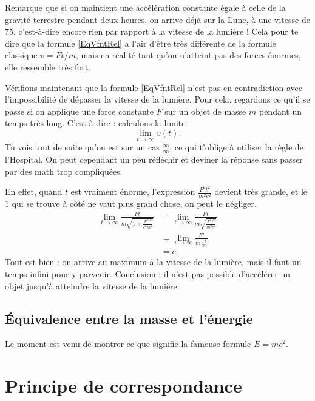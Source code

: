 Remarque que si on maintient une accélération constante égale à celle de la gravité terrestre pendant deux heures, on arrive déjà sur la Lune, à une vitesse de \unit{75}{\kilo\meter\per\second}, c'est-à-dire encore rien par rapport à la vitesse de la lumière ! Cela pour te dire que la formule \eqref{EqVfntRel} a l'air d'être très différente de la formule classique $v=Ft/m$, mais en réalité tant qu'on n'atteint pas des forces énormes, elle ressemble très fort.

Vérifions maintenant que la formule \eqref{EqVfntRel} n'est pas en contradiction avec l'impossibilité de dépasser la vitesse de la lumière. Pour cela, regardons ce qu'il se passe si on applique une force constante $F$ sur un objet de masse $m$ pendant un temps très long. C'est-à-dire : calculons la limite
\[
  \lim_{t\to\infty}v(t).
\]
Tu vois tout de suite qu'on est sur un cas $\frac{ \infty }{ \infty }$, ce qui t'oblige à utiliser la règle de l'Hospital. On peut cependant un peu réfléchir et deviner la réponse sans passer par des math trop compliquées.

En effet, quand $t$ est vraiment énorme, l'expression $\frac{ F^2t^2 }{ m^2c^2 }$ devient très grande, et le $1$ qui se trouve à côté ne vaut plus grand chose, on peut le négliger.
\begin{equation}
\begin{split}
\lim_{t\to\infty}\frac{ Ft }{ m\sqrt{1+\frac{ F^2t^2 }{ c^2m^2 }} }&=\lim_{t\to\infty}\frac{ Ft }{ m\sqrt{\frac{ F^2t^2 }{ m^2c^2 }} }\\
		&=\lim_{v\to\infty}\frac{ Ft }{ m\frac{ Ft }{ cm } }\\
		&=c.
\end{split}
\end{equation}
Tout est bien : on arrive au maximum à la vitesse de la lumière, mais il faut un temps infini pour y parvenir. Conclusion : il n'est pas possible d'accélérer un objet jusqu'à atteindre la vitesse de la lumière.

\subsection{Équivalence entre la masse et l'énergie}

Le moment est venu de montrer ce que signifie la fameuse formule $E=mc^2$.

\section{Principe de correspondance}

